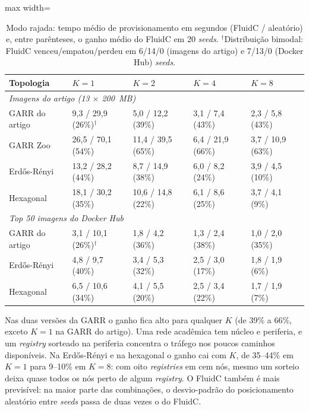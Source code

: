 \documentclass[12pt]{article}
\begin{document}
\begin{table}[ht]
\centering
\caption{Modo rajada: tempo médio de provisionamento em segundos (FluidC /
aleatório) e, entre parênteses, o ganho médio do FluidC em 20 \textit{seeds}.
$^\dagger$Distribuição bimodal: FluidC venceu/empatou/perdeu em 6/14/0
(imagens do artigo) e 7/13/0 (Docker Hub) \textit{seeds}.}
\label{tab:rajada}
\small
\begin{adjustbox}{max width=\textwidth}
\begin{tabular}{lllll}
\toprule
Topologia & $K=1$ & $K=2$ & $K=4$ & $K=8$ \\
\midrule
\multicolumn{5}{l}{\textit{Imagens do artigo (13 $\times$ 200~MB)}} \\
GARR do artigo & 9,3 / 29,9 (26\%)$^\dagger$ & 5,0 / 12,2 (39\%) & 3,1 / 7,4 (43\%) & 2,3 / 5,8 (43\%) \\
GARR Zoo & 26,5 / 70,1 (54\%) & 11,4 / 39,5 (65\%) & 6,4 / 21,9 (66\%) & 3,7 / 10,9 (63\%) \\
Erdős-Rényi & 13,2 / 28,2 (44\%) & 8,7 / 14,9 (38\%) & 6,0 / 8,2 (24\%) & 3,9 / 4,5 (10\%) \\
Hexagonal & 18,1 / 30,2 (35\%) & 10,6 / 14,8 (22\%) & 6,1 / 8,6 (25\%) & 3,7 / 4,1 (9\%) \\
\midrule
\multicolumn{5}{l}{\textit{Top 50 imagens do Docker Hub}} \\
GARR do artigo & 3,1 / 10,1 (26\%)$^\dagger$ & 1,8 / 4,2 (36\%) & 1,3 / 2,4 (38\%) & 1,0 / 2,0 (35\%) \\
Erdős-Rényi & 4,8 / 9,7 (40\%) & 3,4 / 5,3 (32\%) & 2,5 / 3,0 (17\%) & 1,8 / 1,9 (6\%) \\
Hexagonal & 6,5 / 10,6 (34\%) & 4,1 / 5,5 (20\%) & 2,5 / 3,4 (22\%) & 1,7 / 1,9 (7\%) \\
\bottomrule
\end{tabular}
\end{adjustbox}
\end{table}

Nas duas versões da GARR o ganho fica alto para qualquer $K$ (de 39\% a 66\%,
exceto $K = 1$ na GARR do artigo). Uma rede acadêmica tem núcleo e periferia, e um
\textit{registry} sorteado na periferia concentra o tráfego nos poucos caminhos
disponíveis. Na Erdős-Rényi e na hexagonal o ganho cai com $K$, de 35--44\% em
$K = 1$ para 9--10\% em $K = 8$: com oito \textit{registries} em cem nós, mesmo
um sorteio deixa quase todos os nós perto de algum \textit{registry}. O FluidC
também é mais previsível: na maior parte das combinações, o desvio-padrão do
posicionamento aleatório entre \textit{seeds} passa de duas vezes o do FluidC.
\end{document}
